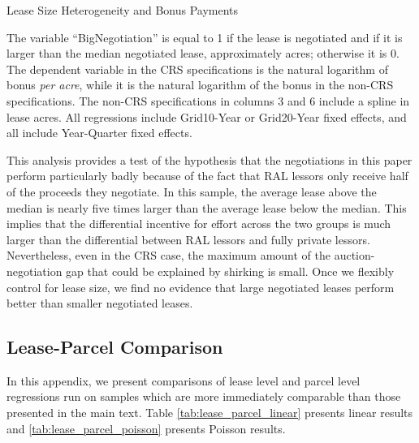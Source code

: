 \documentclass[12pt]{article}
\newcommand{\inputy}[1]{\unskip}
\begin{document}
\begin{appendices}
\addtolength{\tabcolsep}{5pt}
\begin{table}[H]
\begin{center}
\begin{threeparttable}
	\caption{Lease Size Heterogeneity and Bonus Payments}
	\label{tab:LeaseSizeHet}
 	\small
   	            
    \footnotesize
    \begin{tablenotes}
    	\item The variable ``BigNegotiation'' is equal to 1 if the lease is negotiated and if it is larger than the median negotiated lease, approximately \inputy{../output/estimates/negotiation_med_size.tex} acres; otherwise it is 0.  The dependent variable in the CRS specifications is the natural logarithm of bonus \textit{per acre}, while it is the natural logarithm of the bonus in the non-CRS specifications.  The non-CRS specifications in columns 3 and 6 include a spline in lease acres. All regressions include Grid10-Year or Grid20-Year fixed effects, and all include Year-Quarter fixed effects.
    \end{tablenotes}
\end{threeparttable}
\end{center}
\end{table}

This analysis provides a test of the hypothesis that the negotiations in this paper perform particularly badly because of the fact that RAL lessors only receive half of the proceeds they negotiate. In this sample, the average lease above the median is nearly five times larger than the average lease below the median. This implies that the differential incentive for effort across the two groups is much larger than the differential between RAL lessors and fully private lessors. Nevertheless, even in the CRS case, the maximum amount of the auction-negotiation gap that could be explained by shirking is small. Once we flexibly control for lease size, we find no evidence that large negotiated leases perform better than smaller negotiated leases. 

\pagebreak

\subsection{Lease-Parcel Comparison}\label{app:lease-parcel-decomp}
In this appendix, we present comparisons of lease level and parcel level regressions run on samples which are more immediately comparable than those presented in the main text. Table \ref{tab:lease_parcel_linear} presents linear results and \ref{tab:lease_parcel_poisson} presents Poisson results. 


\end{appendices}
\end{document}
